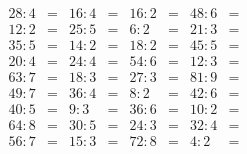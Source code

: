 \documentclass[14pt, a4paper]{extarticle}
\begin{document}
\begin{align*}
28:4&= & 16:4&= & 16:2&= & 48:6&=\\
12:2&= & 25:5&= & 6:2&= & 21:3&=\\
35:5&= & 14:2&= & 18:2&= & 45:5&=\\
20:4&= & 24:4&= & 54:6&= & 12:3&=\\
63:7&= & 18:3&= & 27:3&= & 81:9&=\\
49:7&= & 36:4&= & 8:2&= & 42:6&=\\
40:5&= & 9:3&= & 36:6&= & 10:2&=\\
64:8&= & 30:5&= & 24:3&= & 32:4&=\\
56:7&= & 15:3&= & 72:8&= & 4:2&=
\end{align*}
\end{document}
